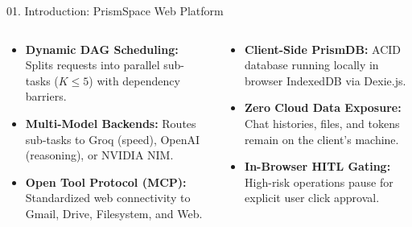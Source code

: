\documentclass[aspectratio=169,10pt]{beamer}
\begin{document}
\begin{frame}[t]{01. Introduction: PrismSpace Web Platform}
\begin{columns}[T, totalwidth=0.98\linewidth]
  \begin{column}{0.32\linewidth}
    \begin{tcolorbox}[
      enhanced, arc=3.5pt, colframe=prismTeal!90!black, colback=white,
      title={\scriptsize\bfseries\color{white}\faProjectDiagram\ 2. Intelligent Swarm Routing},
      colbacktitle=prismTeal!90!black, boxrule=0.6pt,
      left=5pt, right=5pt, top=3.5pt, bottom=3.5pt, height=3.85cm
    ]
    \fontsize{5.6}{6.8}\selectfont
    \begin{itemize}\setlength{\itemsep}{2.5pt}
      \item \textbf{Dynamic DAG Scheduling:} Splits requests into parallel sub-tasks ($K \le 5$) with dependency barriers.
      \item \textbf{Multi-Model Backends:} Routes sub-tasks to Groq (speed), OpenAI (reasoning), or NVIDIA NIM.
      \item \textbf{Open Tool Protocol (MCP):} Standardized web connectivity to Gmail, Drive, Filesystem, and Web.
    \end{itemize}
    \end{tcolorbox}
  \end{column}

  \begin{column}{0.32\linewidth}
    \begin{tcolorbox}[
      enhanced, arc=3.5pt, colframe=prismGold!90!black, colback=white,
      title={\scriptsize\bfseries\color{white}\faLock\ 3. Local Privacy \& Safety},
      colbacktitle=prismGold!90!black, boxrule=0.6pt,
      left=5pt, right=5pt, top=3.5pt, bottom=3.5pt, height=3.85cm
    ]
    \fontsize{5.6}{6.8}\selectfont
    \begin{itemize}\setlength{\itemsep}{2.5pt}
      \item \textbf{Client-Side PrismDB:} ACID database running locally in browser IndexedDB via Dexie.js.
      \item \textbf{Zero Cloud Data Exposure:} Chat histories, files, and tokens remain on the client's machine.
      \item \textbf{In-Browser HITL Gating:} High-risk operations pause for explicit user click approval.
    \end{itemize}
    \end{tcolorbox}
  \end{column}

\end{columns}

\end{frame}
\end{document}
